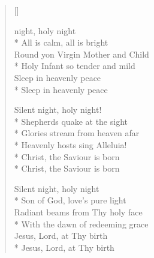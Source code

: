 \newHymn
{}

\begin{verse}[\versewidth]

\begin{patverse}
 night, holy night\\*
     All is calm, all is bright\\
  Round yon Virgin Mother and Child\\*
   Holy Infant so tender and mild\\
       Sleep in heavenly peace\\*
       Sleep in heavenly peace
\end{patverse}
\pointorig

\begin{patverse}
   Silent night, holy night!\\*
    Shepherds quake at the sight\\*
   Glories stream from heaven afar\\*
    Heavenly hosts sing Alleluia!\\*
     Christ, the Saviour is born\\*
     Christ, the Saviour is born
\end{patverse}

\begin{patverse}
 Silent night, holy night\\*
    Son of God, love's pure light\\
  Radiant beams from Thy holy face\\*
  With the dawn of redeeming grace\\
      Jesus, Lord, at Thy birth\\*
     Jesus, Lord, at Thy birth
\end{patverse}

\end{verse}


